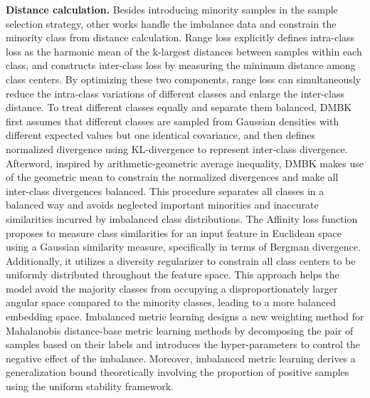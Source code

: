 
\textbf{Distance calculation.}
Besides introducing minority samples in the sample selection strategy, other works handle the imbalance data and constrain the minority class from distance calculation.
Range loss \cite{zhang2017range} explicitly defines intra-class loss as the harmonic mean of the k-largest distances between samples within each class, and constructs inter-class loss by measuring the minimum distance among class centers. By optimizing these two components, range loss can simultaneously reduce the intra-class variations of different classes and enlarge the inter-class distance.
To treat different classes equally and separate them balanced, DMBK \cite{feng2018learning} first assumes that different classes are sampled from Gaussian densities with different expected values but one identical covariance, and then defines normalized divergence using KL-divergence to represent inter-class divergence. Afterword, inspired by arithmetic-geometric average inequality, DMBK makes use of the geometric mean to constrain the normalized divergences and make all inter-class divergences balanced. This procedure separates all classes in a balanced way and avoids neglected important minorities and inaccurate similarities incurred by imbalanced class distributions.
The Affinity loss function \cite{hayat2019gaussian} proposes to measure class similarities for an input feature in Euclidean space using a Gaussian similarity measure, specifically in terms of Bergman divergence. Additionally, it utilizes a diversity regularizer to constrain all class centers to be uniformly distributed throughout the feature space. This approach helps the model avoid the majority classes from occupying a disproportionately larger angular space compared to the minority classes, leading to a more balanced embedding space.
Imbalanced metric learning \cite{gautheron2020metric} designs a new weighting method for Mahalanobis distance-base metric learning methods by decomposing the pair of samples based on their labels and introduces the hyper-parameters to control the negative effect of the imbalance. Moreover, imbalanced metric learning derives a generalization bound theoretically involving the proportion of positive samples using the uniform stability framework. 

